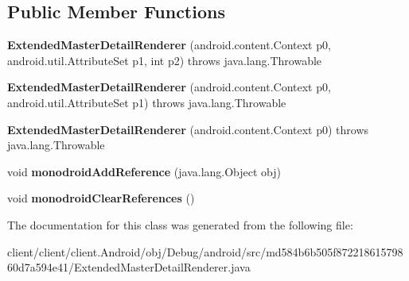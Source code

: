 \subsection*{Public Member Functions}
\begin{DoxyCompactItemize}
\item 
\hypertarget{classmd584b6b505f87221861579860d7a594e41_1_1ExtendedMasterDetailRenderer_af57762cee29e2884469c4c1236e0679b}{}{\bfseries Extended\+Master\+Detail\+Renderer} (android.\+content.\+Context p0, android.\+util.\+Attribute\+Set p1, int p2)  throws java.\+lang.\+Throwable 	\label{classmd584b6b505f87221861579860d7a594e41_1_1ExtendedMasterDetailRenderer_af57762cee29e2884469c4c1236e0679b}

\item 
\hypertarget{classmd584b6b505f87221861579860d7a594e41_1_1ExtendedMasterDetailRenderer_af472bf9a14a47eb703895a4e7134fca3}{}{\bfseries Extended\+Master\+Detail\+Renderer} (android.\+content.\+Context p0, android.\+util.\+Attribute\+Set p1)  throws java.\+lang.\+Throwable 	\label{classmd584b6b505f87221861579860d7a594e41_1_1ExtendedMasterDetailRenderer_af472bf9a14a47eb703895a4e7134fca3}

\item 
\hypertarget{classmd584b6b505f87221861579860d7a594e41_1_1ExtendedMasterDetailRenderer_ad397702ac2d146ea54d32fddde53f295}{}{\bfseries Extended\+Master\+Detail\+Renderer} (android.\+content.\+Context p0)  throws java.\+lang.\+Throwable 	\label{classmd584b6b505f87221861579860d7a594e41_1_1ExtendedMasterDetailRenderer_ad397702ac2d146ea54d32fddde53f295}

\item 
\hypertarget{classmd584b6b505f87221861579860d7a594e41_1_1ExtendedMasterDetailRenderer_a9157df51a665b526256c67a38a822eaa}{}void {\bfseries monodroid\+Add\+Reference} (java.\+lang.\+Object obj)\label{classmd584b6b505f87221861579860d7a594e41_1_1ExtendedMasterDetailRenderer_a9157df51a665b526256c67a38a822eaa}

\item 
\hypertarget{classmd584b6b505f87221861579860d7a594e41_1_1ExtendedMasterDetailRenderer_a27b47160a3c0118d790c700ee02d1684}{}void {\bfseries monodroid\+Clear\+References} ()\label{classmd584b6b505f87221861579860d7a594e41_1_1ExtendedMasterDetailRenderer_a27b47160a3c0118d790c700ee02d1684}

\end{DoxyCompactItemize}


The documentation for this class was generated from the following file\+:\begin{DoxyCompactItemize}
\item 
client/client/client.\+Android/obj/\+Debug/android/src/md584b6b505f87221861579860d7a594e41/Extended\+Master\+Detail\+Renderer.\+java\end{DoxyCompactItemize}
